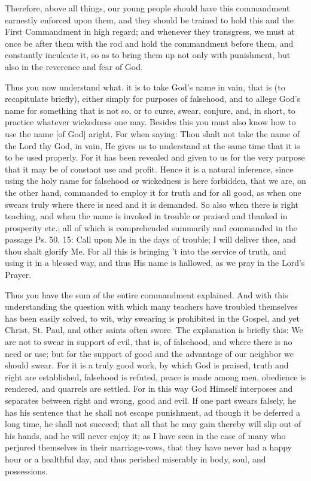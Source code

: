 Therefore, above all things, our young people should have this
commandment earnestly enforced upon them, and they should be trained to
hold this and the First Commandment in high regard; and whenever they
transgress, we must at once be after them with the rod and hold the
commandment before them, and constantly inculcate it, so as to bring
them up not only with punishment, but also in the reverence and fear of
God.

Thus you now understand what. it is to take God's name in vain, that is
(to recapitulate briefly), either simply for purposes of falsehood, and
to allege God's name for something that is not so, or to curse, swear,
conjure, and, in short, to practice whatever wickedness one may.
Besides this you must also know how to use the name [of God] aright.
For when saying: Thou shalt not take the name of the Lord thy God, in
vain, He gives us to understand at the same time that it is to be used
properly. For it has been revealed and given to us for the very purpose
that it may be of constant use and profit. Hence it is a natural
inference, since using the holy name for falsehood or wickedness is
here forbidden, that we are, on the other hand, commanded to employ it
for truth and for all good, as when one swears truly where there is
need and it is demanded. So also when there is right teaching, and when
the name is invoked in trouble or praised and thanked in prosperity
etc.; all of which is comprehended summarily and commanded in the
passage Ps. 50, 15: Call upon Me in the days of trouble; I will deliver
thee, and thou shalt glorify Me. For all this is bringing 't into the
service of truth, and using it in a blessed way, and thus His name is
hallowed, as we pray in the Lord's Prayer.

Thus you have the sum of the entire commandment explained. And with
this understanding the question with which many teachers have troubled
themselves has been easily solved, to wit, why swearing is prohibited
in the Gospel, and yet Christ, St. Paul, and other saints often swore.
The explanation is briefly this: We are not to swear in support of
evil, that is, of falsehood, and where there is no need or use; but for
the support of good and the advantage of our neighbor we should swear.
For it is a truly good work, by which God is praised, truth and right
are established, falsehood is refuted, peace is made among men,
obedience is rendered, and quarrels are settled. For in this way God
Himself interposes and separates between right and wrong, good and
evil. If one part swears falsely, he has his sentence that he shall not
escape punishment, ad though it be deferred a long time, he shall not
succeed; that all that he may gain thereby will slip out of his hands,
and he will never enjoy it; as I have seen in the case of many who
perjured themselves in their marriage-vows, that they have never had a
happy hour or a healthful day, and thus perished miserably in body,
soul, and possessions.

